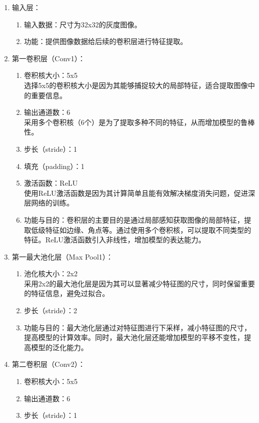 \documentclass{lzureport}
\begin{document}
\begin{enumerate}[label=\arabic*)]
	\item 输入层：
	\begin{enumerate}[itemindent=1em,label=(\arabic*)]
		\item 输入数据：尺寸为32x32的灰度图像。
		\item 功能：提供图像数据给后续的卷积层进行特征提取。
	\end{enumerate}
	\item 第一卷积层（Conv1）：
	\begin{enumerate}[itemindent=1em,label=(\arabic*)]
		\item 卷积核大小：5x5\\
		选择5x5的卷积核大小是因为其能够捕捉较大的局部特征，适合提取图像中的重要信息。
		\item 输出通道数：6\\
		采用多个卷积核（6个）是为了提取多种不同的特征，从而增加模型的鲁棒性。
		\item 步长（stride）：1
		\item 填充（padding）：1
		\item 激活函数：ReLU\\
		使用ReLU激活函数是因为其计算简单且能有效解决梯度消失问题，促进深层网络的训练。
		\item 功能与目的：卷积层的主要目的是通过局部感知获取图像的局部特征，提取低级特征如边缘、角点等。通过使用多个卷积核，可以提取不同类型的特征。ReLU激活函数引入非线性，增加模型的表达能力。
	\end{enumerate}
	\item 第一最大池化层（Max Pool1）：
	\begin{enumerate}[itemindent=1em,label=(\arabic*)]
		\item 池化核大小：2x2\\
		采用2x2的最大池化层是因为其可以显著减少特征图的尺寸，同时保留重要的特征信息，避免过拟合。
		\item 步长（stride）：2
		\item 功能与目的：最大池化层通过对特征图进行下采样，减小特征图的尺寸，提高模型的计算效率。同时，最大池化层还能增加模型的平移不变性，提高模型的泛化能力。
	\end{enumerate}
	\item 第二卷积层（Conv2）：
	\begin{enumerate}[itemindent=1em,label=(\arabic*)]
		\item 卷积核大小：5x5
		\item 输出通道数：6
		\item 步长（stride）：1

\end{enumerate}
\end{enumerate}
\end{document}
